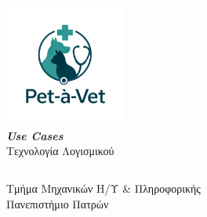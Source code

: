 \documentclass[12pt,a4paper,twoside]{book}
\renewcommand{\headrulewidth}{0pt} %
\renewcommand{\headrulewidth}{0pt}
\let\oldtableofcontents\tableofcontents
\renewcommand{\tableofcontents}{%
    \clearpage
    \thispagestyle{empty}
    \pagestyle{tocstyle}
    \oldtableofcontents %
    \clearpage
    \pagestyle{fancy}
    \fancyhead[LE]{\thepage} %
    \fancyhead[CE]{\leftmark} %
    \fancyhead[RE]{ΚΕΦ. \thechapter} %

    \fancyhead[LO]{\thesection} %
    \fancyhead[CO]{\rightmark} %
    \fancyhead[RO]{\thepage} %

    \renewcommand{\headrulewidth}{0.4pt} %

    \renewcommand{\chaptermark}[1]{\markboth{##1}{}}
    \renewcommand{\sectionmark}[1]{\markright{##1}}
}
\begin{document}
\let\cleardoublepage\clearpage


\begin{titlepage}
  \vspace*{8cm}
  \begin{center}
    \includegraphics[width=0.3\textwidth]{../Resources/Pet-a-vet-logo-transparent.png}\\
    \vspace*{0.5cm}
    {\large \textbf{\textit{Use Cases}}}\\
    {\large Τεχνολογία Λογισμικού}
    \vspace*{5cm}
    \\
    \vspace*{1cm}
    \begin{tabular}{l l l}
    \end{tabular}

    \vspace*{1cm}

    {\normalsize Τμήμα Μηχανικών Η/Υ \& Πληροφορικής}
    \\
    {\normalsize Πανεπιστήμιο Πατρών}
    \\
  \end{center}
  \thispagestyle{empty} %
\end{titlepage}

\tableofcontents

\printindex
\end{document}
